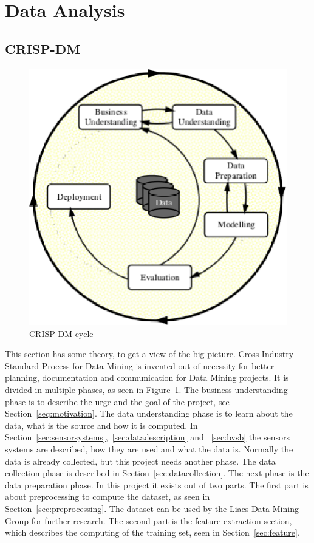 \section{Data Analysis}
	\subsection{CRISP-DM}
	\label{sec:datamodeling}
	\begin{figure}[h]
		\centering
		\includegraphics[scale=0.75]{crispdm.eps}
					
		\caption{CRISP-DM \cite{wirth2000crisp} cycle}
		\label{fig:crispdm}

	\end{figure}
	This section has some theory, to get a view of the big picture. Cross Industry Standard Process for Data Mining \cite{wirth2000crisp} is invented out of necessity for better planning, documentation and communication for Data Mining projects. It is divided in multiple phases, as seen in Figure~\ref{fig:crispdm}. The business understanding phase is to describe the urge and the goal of the project, see Section~\ref{seq:motivation}. The data understanding phase is to learn about the data, what is the source and how it is computed. In Section~\ref{sec:sensorsystems},~\ref{sec:datadescription} and ~\ref{sec:bvsb} the sensors systems are described, how they are used and what the data is. Normally the data is already collected, but this project needs another phase. The data collection phase is described in Section~\ref{sec:datacollection}. The next phase is the data preparation phase. In this project it exists out of two parts. The first part is about preprocessing to compute the dataset, as seen in Section~\ref{sec:preprocessing}. The dataset can be used by the Liacs Data Mining Group for further research. The second part is the feature extraction section, which describes the computing of the training set, seen in Section~\ref{sec:feature}. 
